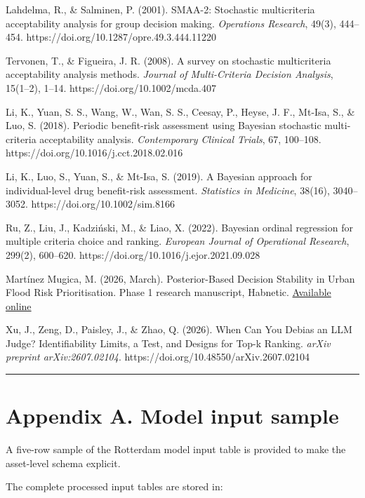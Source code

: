 \documentclass[
]{article}
\begin{document}
Lahdelma, R., \& Salminen, P. (2001). SMAA-2: Stochastic multicriteria
acceptability analysis for group decision making. \emph{Operations
Research}, 49(3), 444--454. https://doi.org/10.1287/opre.49.3.444.11220

Tervonen, T., \& Figueira, J. R. (2008). A survey on stochastic
multicriteria acceptability analysis methods. \emph{Journal of
Multi-Criteria Decision Analysis}, 15(1--2), 1--14.
https://doi.org/10.1002/mcda.407

Li, K., Yuan, S. S., Wang, W., Wan, S. S., Ceesay, P., Heyse, J. F.,
Mt-Isa, S., \& Luo, S. (2018). Periodic benefit-risk assessment using
Bayesian stochastic multi-criteria acceptability analysis.
\emph{Contemporary Clinical Trials}, 67, 100--108.
https://doi.org/10.1016/j.cct.2018.02.016

Li, K., Luo, S., Yuan, S., \& Mt-Isa, S. (2019). A Bayesian approach for
individual-level drug benefit-risk assessment. \emph{Statistics in
Medicine}, 38(16), 3040--3052. https://doi.org/10.1002/sim.8166

Ru, Z., Liu, J., Kadziński, M., \& Liao, X. (2022). Bayesian ordinal
regression for multiple criteria choice and ranking. \emph{European
Journal of Operational Research}, 299(2), 600--620.
https://doi.org/10.1016/j.ejor.2021.09.028

Martínez Mugica, M. (2026, March). Posterior-Based Decision Stability in
Urban Flood Risk Prioritisation. Phase 1 research manuscript, Habnetic.
\href{https://github.com/Habnetic/habnetic-papers/blob/master/phase1_rtm_decision_stability/phase1_rtm_decision_stability.pdf}{Available
online}

Xu, J., Zeng, D., Paisley, J., \& Zhao, Q. (2026). When Can You Debias
an LLM Judge? Identifiability Limits, a Test, and Designs for Top-k
Ranking. \emph{arXiv preprint arXiv:2607.02104}.
https://doi.org/10.48550/arXiv.2607.02104

\begin{center}\rule{0.5\linewidth}{0.5pt}\end{center}

\section{Appendix A. Model input
sample}\label{appendix-a.-model-input-sample}

A five-row sample of the Rotterdam model input table is provided to make
the asset-level schema explicit.

The complete processed input tables are stored in:
\end{document}
